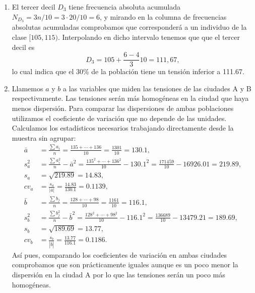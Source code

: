 {\begin{enumerate}
\[
g_1=\frac{\sum (x-\bar{x})^3n_i/n}{s^3}=\frac{-9720/20}{15.84^3}=-0.12.
\]
Esto indica que la distribución es ligeramente asimétrica a la izquierda.

\item El tercer decil $D_3$ tiene frecuencia absoluta acumulada $N_{D_3}=3n/10=3\cdot 20/10=6$, y mirando en la columna de frecuencias absolutas acumuladas comprobamos que corresponderá a un individuo de la clase $[105,115)$. Interpolando en dicho intervalo tenemos que que el tercer decil es
\[ D_3=105+\frac{6-4}{3}10=111,67,
\]
lo cual indica que  el 30\% de la población tiene un tensión inferior a 111.67.

\item Llamemos $a$ y $b$ a las variables que miden las tensiones de las ciudades A y B respectivamente. Las tensiones serán más homogéneas en la ciudad que haya menos dispersión. Para comparar las dispersiones de ambas poblaciones utilizamos el coeficiente de variación que no depende de las unidades. Calculamos los estadísticos necesarios trabajando directamente desde la muestra sin agrupar:
\begin{align*}
\bar{a} & = \frac{\sum a_{i}}{n}=\frac{135+\cdots+136}{10}=\frac{1301}{10}=130.1,  \\
s_{a}^2 & = \frac{\sum a_{i}^2}{n}-\bar{a}^2 =
\frac{135^2+\cdots+136^2}{10}-130.1^2=\frac{171459}{10}-16926.01=219.89,  \\
s_{a} & = \sqrt{219.89}=14.83,  \\
cv_a &=\frac{s_a}{|\bar{a}|}=\frac{14.83}{130.1}=0.1139,\\
\bar{b} & = \frac{\sum b_{j}}{n}=\frac{128+\cdots+98}{10}=
\frac{1161}{10}=116.1,  \\
s_{b}^2 & = \frac{\sum b_{j}^2}{n}-\bar{b}^2 =
\frac{128^2+\cdots+98^2}{10}-116.1^2=\frac{136689}{10}-13479.21=189.69,  \\
s_{b} & = \sqrt{189.69}=13.77,  \\
cv_b &=\frac{s_b}{|\bar{b}|}=\frac{13.77}{116.1}=0.1186.
\end{align*}
Así pues, comparando los coeficientes de variación en ambas ciudades comprobamos que son prácticamente iguales aunque es un poco menor la dispersión en la ciudad A por lo que las tensiones serán un poco más homogéneas.
\end{enumerate}
}


